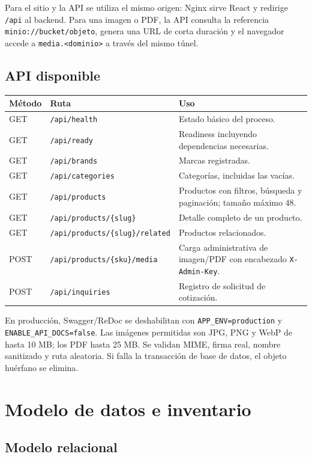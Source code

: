 \documentclass[11pt,a4paper]{article}
\newcommand{\code}[1]{\nolinkurl{#1}}
\begin{document}
Para el sitio y la API se utiliza el mismo origen: Nginx sirve React y redirige \code{/api} al backend. Para una imagen o PDF, la API consulta la referencia \code{minio://bucket/objeto}, genera una URL de corta duración y el navegador accede a \code{media.<dominio>} a través del mismo túnel.

\subsection{API disponible}

\begin{longtable}{L{2.2cm}L{5.6cm}L{7.0cm}}
\toprule
\textbf{Método} & \textbf{Ruta} & \textbf{Uso}\\
\midrule
\endhead
GET & \code{/api/health} & Estado básico del proceso.\\
GET & \code{/api/ready} & Readiness incluyendo dependencias necesarias.\\
GET & \code{/api/brands} & Marcas registradas.\\
GET & \code{/api/categories} & Categorías, incluidas las vacías.\\
GET & \code{/api/products} & Productos con filtros, búsqueda y paginación; tamaño máximo 48.\\
GET & \code{/api/products/\{slug\}} & Detalle completo de un producto.\\
GET & \code{/api/products/\{slug\}/related} & Productos relacionados.\\
POST & \code{/api/products/\{sku\}/media} & Carga administrativa de imagen/PDF con encabezado \code{X-Admin-Key}.\\
POST & \code{/api/inquiries} & Registro de solicitud de cotización.\\
\bottomrule
\end{longtable}

En producción, Swagger/ReDoc se deshabilitan con \code{APP_ENV=production} y \code{ENABLE_API_DOCS=false}. Las imágenes permitidas son JPG, PNG y WebP de hasta 10 MB; los PDF hasta 25 MB. Se validan MIME, firma real, nombre sanitizado y ruta aleatoria. Si falla la transacción de base de datos, el objeto huérfano se elimina.

\section{Modelo de datos e inventario}

\subsection{Modelo relacional}
\end{document}
